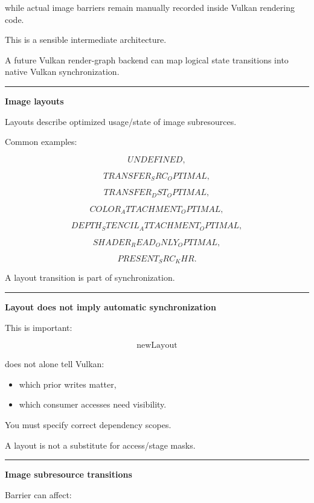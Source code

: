 while actual image barriers remain manually recorded inside Vulkan rendering code.

This is a sensible intermediate architecture.

A future Vulkan render-graph backend can map logical state transitions into native Vulkan synchronization.

\begin{center}\rule{0.5\linewidth}{0.5pt}\end{center}

\textbf{Image layouts}

Layouts describe optimized usage/state of image subresources.

Common examples:

\[
UNDEFINED,
\]

\[
TRANSFER_SRC_OPTIMAL,
\]

\[
TRANSFER_DST_OPTIMAL,
\]

\[
COLOR_ATTACHMENT_OPTIMAL,
\]

\[
DEPTH_STENCIL_ATTACHMENT_OPTIMAL,
\]

\[
SHADER_READ_ONLY_OPTIMAL,
\]

\[
PRESENT_SRC_KHR.
\]

A layout transition is part of synchronization.

\begin{center}\rule{0.5\linewidth}{0.5pt}\end{center}

\textbf{Layout does not imply automatic synchronization}

This is important:

\[
\boxed{
\text{newLayout}
}
\]

does not alone tell Vulkan:

\begin{itemize}
\tightlist
\item
  which prior writes matter,
\item
  which consumer accesses need visibility.
\end{itemize}

You must specify correct dependency scopes.

A layout is not a substitute for access/stage masks.

\begin{center}\rule{0.5\linewidth}{0.5pt}\end{center}

\textbf{Image subresource transitions}

Barrier can affect:

